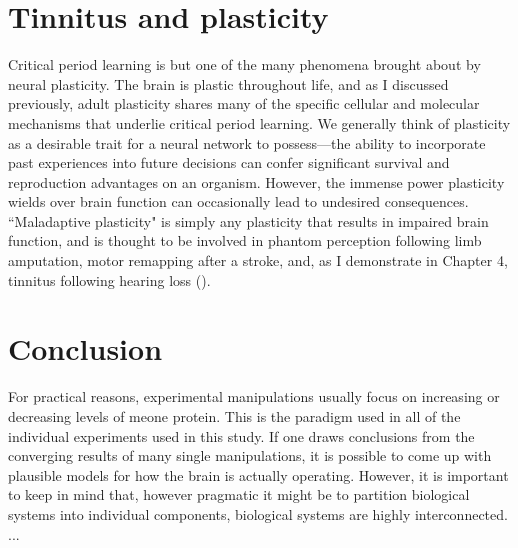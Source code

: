 \section{Tinnitus and plasticity}

Critical period learning is but one of the many phenomena brought about by neural plasticity. The brain is plastic throughout life, and as I discussed previously, adult plasticity shares many of the specific cellular and molecular mechanisms that underlie critical period learning. We generally think of plasticity as a desirable trait for a neural network to possess---the ability to incorporate past experiences into future decisions can confer significant survival and reproduction advantages on an organism. However, the immense power plasticity wields over brain function can occasionally lead to undesired consequences. ``Maladaptive plasticity" is simply any plasticity that results in impaired brain function, and is thought to be involved in phantom perception following limb amputation, motor remapping after a stroke, and, as I demonstrate in Chapter 4, tinnitus following hearing loss (\cite{Flor2006, Takeuchi2012}).


\section{Conclusion}
For practical reasons, experimental manipulations usually focus on increasing or decreasing levels of meone protein. This is the paradigm used in all of the individual experiments used in this study. If one draws conclusions from the converging results of many single manipulations, it is possible to come up with plausible models for how the brain is actually operating. However, it is important to keep in mind that, however pragmatic it might be to partition biological systems into individual components, biological systems are highly interconnected.
...

